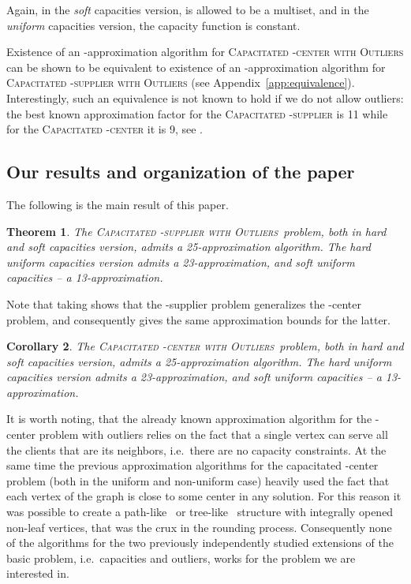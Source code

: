 \documentclass{article}
\newcommand{\fullsup}{\textsc{Capacitated} -\textsc{supplier with Outliers}}
\newcommand{\fullcen}{\textsc{Capacitated} -\textsc{center with Outliers}}
\theoremstyle{plain}
\newtheorem{theorem}{Theorem}
\newtheorem{corollary}[theorem]{Corollary}
\theoremstyle{definition}
\begin{document}
Again, in the \emph{soft} capacities version,  is allowed to be a multiset,
and in the \emph{uniform} capacities version, the capacity function  is
constant.

Existence of an -approximation algorithm for \textsc{Capacitated} -\textsc{center with Outliers}
can be shown to be equivalent to existence of an -approximation algorithm for \textsc{Capacitated} -\textsc{supplier with Outliers}
(see Appendix~\ref{app:equivalence}).
Interestingly, such an equivalence is not known to hold if we do not allow outliers:
the best known approximation factor for the \textsc{Capacitated} -\textsc{supplier} is 11
while for the \textsc{Capacitated} -\textsc{center} it is 9, see \cite{svensson}.


\subsection{Our results and organization of the paper}

The following is the main result of this paper.

\begin{theorem}
The \fullsup\ 
problem, both in hard and soft
capacities version, admits a 25-approximation algorithm.
The hard uniform capacities version admits a 23-approximation, and soft uniform
capacities -- a 13-approximation.
\end{theorem}
Note that taking  shows that 
the -supplier problem generalizes the -center problem, 
and consequently gives the same approximation bounds for the latter.
\begin{corollary}
The \fullcen\ 
problem, both in hard and soft
capacities version, admits a 25-approximation algorithm. 
The hard uniform capacities version admits a 23-approximation, and soft uniform
capacities -- a 13-approximation.
\end{corollary}

It is worth noting, that the already known approximation algorithm
for the -center problem with outliers relies on the fact 
that a single vertex can serve all the clients that are its neighbors,
i.e.\ there are no capacity constraints.
At the same time the previous approximation algorithms
for the capacitated -center problem (both in the uniform
and non-uniform case) heavily used the fact that 
each vertex of the graph is close to some center in any solution.
For this reason it was possible to create a path-like~\cite{chk-focs12}
or tree-like~\cite{svensson} structure
with integrally opened non-leaf vertices, that was the crux in
the rounding process. 
Consequently none of the algorithms for the two previously independently
studied extensions of the basic problem, i.e.\ capacities and outliers,
works for the problem we are interested in.
\end{document}
